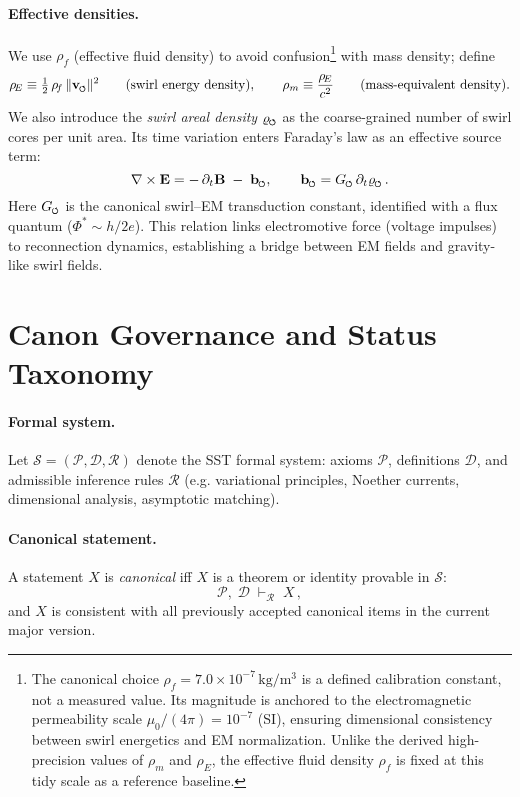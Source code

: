 \documentclass[11pt]{article}
\newcommand{\swirlarrow}{%
     \mathchoice{\mkern-2mu\scriptstyle\boldsymbol{\circlearrowleft}}%
                {\mkern-2mu\scriptstyle\boldsymbol{\circlearrowleft}}%
                {\mkern-2mu\scriptscriptstyle\boldsymbol{\circlearrowleft}}%
                {\mkern-2mu\scriptscriptstyle\boldsymbol{\circlearrowleft}}%
}
\newcommand{\vswirl}{\mathbf{v}_{\swirlarrow}}
\newcommand{\vnorm}{\lVert \vswirl \rVert}               %
\newcommand{\rhof}{\rho_{\!f}}                           %
\newcommand{\rhoE}{\rho_{\!E}}                           %
\newcommand{\rhom}{\rho_{\!m}}                           %
\begin{document}
    \paragraph{Effective densities.}
        We use $\rhof$ (effective fluid density) to avoid confusion\footnote{The canonical choice
    $\rhof = 7.0\times 10^{-7}\,\mathrm{kg/m^3}$
    is a defined calibration constant, not a measured value.
    Its magnitude is anchored to the electromagnetic permeability scale
    $\mu_0/(4\pi) = 10^{-7}$ (SI), ensuring dimensional consistency between swirl energetics and EM normalization.
    Unlike the derived high-precision values of $\rhom$ and $\rhoE$,
    the effective fluid density $\rhof$ is fixed at this tidy scale as a reference baseline.}
        with mass density; define
        \[
            \rhoE \equiv \tfrac{1}{2}\,\rhof\,\vnorm^2 \qquad (\text{swirl energy density}), \qquad
            \rho_m \equiv \frac{\rhoE}{c^2} \qquad (\text{mass-equivalent density}).
        \]
        We also introduce the \emph{swirl areal density} $\varrho_{\swirlarrow}$ as the coarse-grained number of swirl cores per unit area. Its time variation enters Faraday's law as an effective source term:
        \[
            \nabla \times \mathbf{E} = -\,\partial_t \mathbf{B} \;-\; \mathbf{b}_{\swirlarrow}, \qquad
            \mathbf{b}_{\swirlarrow} = G_{\swirlarrow}\,\partial_t \varrho_{\swirlarrow}\,.
        \]
        Here $G_{\swirlarrow}$ is the canonical swirl–EM transduction constant, identified with a flux quantum ($\Phi^* \sim h/2e$). This relation links electromotive force (voltage impulses) to reconnection dynamics, establishing a bridge between EM fields and gravity-like swirl fields.

\section{Canon Governance and Status Taxonomy}
\label{sec:canon_governance}
\paragraph{Formal system.}
    Let $\mathcal{S}=(\mathcal{P},\mathcal{D},\mathcal{R})$ denote the SST formal system: axioms $\mathcal{P}$, definitions $\mathcal{D}$, and admissible inference rules $\mathcal{R}$ (e.g. variational principles, Noether currents, dimensional analysis, asymptotic matching).

\paragraph{Canonical statement.}
    A statement $X$ is \emph{canonical} iff $X$ is a theorem or identity provable in $\mathcal{S}$:
    \[
        \mathcal{P},\;\mathcal{D}\;\vdash_{\mathcal{R}}\;X\,,
    \]
    and $X$ is consistent with all previously accepted canonical items in the current major version.
\end{document}
